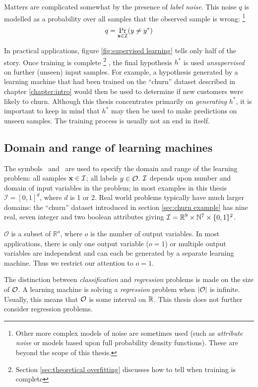 Matters are complicated somewhat by the presence of \emph{label
noise}.  This noise $q$ is modelled as a probability over all samples
that the observed sample is wrong:%
\footnote{Other more complex models of noise are sometimes used (such
as \emph{attribute noise} or models based upon full probability
density functions).  These are beyond the scope of this thesis.}
%
\begin{equation}
q = \Pr_{\mathbf{x} \in \mathcal{I}}(y \neq y^{\ast})
\end{equation}

In practical applications, figure \ref{fig:supervised learning} tells
only half of the story.  Once training is complete%
\footnote{Section \ref{sec:theoretical overfitting} discusses how to
tell when training is complete}%
, the final hypothesis $h^{\ast}$ is used \emph{unsupervised} on
further (unseen) input samples.  For example, a hypothesis generated
by a learning machine that had been trained on the ``churn'' dataset
described in chapter \ref{chapter:intro} would then be used to
determine if new customers were likely to churn.  Although this thesis
concentrates primarily on \emph{generating} $h^{\ast}$, it is
important to keep in mind that $h^{\ast}$ may then be used to make
predictions on unseen samples.  The training process is usually not an
end in itself. 


\subsection{Domain and range of learning machines}
\label{sec:domain and range}

The symbols \calI\ and \calO\ are used to specify the domain and
range of the learning problem: all samples $\mathbf{x} \in \mathcal{I}$; all
labels $y \in \mathcal{O}$.  $\mathcal{I}$ depends upon number and
domain of input variables in the problem; in most examples in this
thesis $\mathcal{I} = [0,1]^d$, where $d$ is 1 or 2.  Real world
problems typically have much larger domains: the ``churn'' dataset
introduced in section \ref{sec:churn example} has nine real, seven
integer and two boolean attributes giving $\mathcal{I} = \mathbb{R}^9 \times \mathbb{N}^7
\times \{0, 1\}^2$.

$\mathcal{O}$ is a subset of $\mathbb{R}^o$, where $o$ is the number
of output variables.  In most applications, there is only one output
variable ($o=1$) or multiple output variables are independent and
can each be generated by a separate learning machine.  Thus we
restrict our attention to $o=1$.

The distinction between \emph{classification} and \emph{regression}
problems is made on the size of $\mathcal{O}$.  A learning machine is
solving a \emph{regression} problem when $|\mathcal{O}|$ is infinite.
Usually, this means that $\mathcal{O}$ is some interval on $\mathbb{R}$.  This
thesis does not further consider regression problems.

